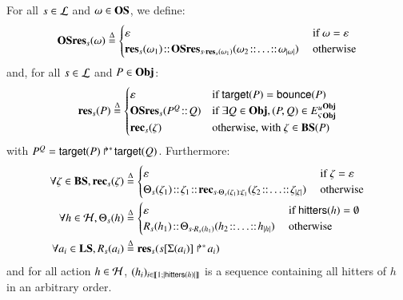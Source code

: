 \begin{definition}[$\osres : \PHl \times \OS \to \Sce$]
\label{def:concret}
For all $s \in \mathcal{L}$ and $\omega \in \mathbf{OS}$, we define:
\[
  \mathbf{OSres}_s(\omega) \stackrel{\Delta}=
    \begin{cases}
      \varepsilon
        & \text{ if $\omega = \varepsilon$} \\
      \mathbf{res}_s(\omega_1) \!::\!
      \mathbf{OSres}_{s \cdot \mathbf{res}_s(\omega_1)}(\omega_2 \!::\! \dots \!::\! \omega_{|\omega|})
        & \text{ otherwise} \\
    \end{cases}
\]
and, for all $s \in \mathcal{L}$ and $P \in \mathbf{Obj}$:
\[\mathbf{res}_s(P) \stackrel{\Delta}=
  \begin{cases}
    \varepsilon
      & \text{if } \mathsf{target}(P) = \mathsf{bounce}(P) \\
    \mathbf{OSres}_s(P^Q \!::\! Q)
      & \text{if } \exists Q \in \mathbf{Obj}, (P, Q) \in {E_\varsigma^u}^{\mathbf{Obj}}_{\mathbf{Obj}} \\
    \mathbf{rec}_s(\zeta)
      & \text{otherwise, with } \zeta \in \mathbf{BS}(P)
  \end{cases}
\]
with $P^Q = \mbox{$\mathsf{target}(P)\Rsh^*\!\mathsf{target}(Q)$}$.
Furthermore:
\begin{align*}
  \forall \zeta \in \BS,
  \rec_s(\zeta) &\DEF
    \begin{cases}
      \emptyseq
        & \text{ if $\zeta = \emptyseq$} \\
      \thisseq_s(\zeta_1) \concat \zeta_1 \concat
      \rec_{s \play \thisseq_s(\zeta_1) \concat \zeta_1}
      (\zeta_2 \concat \dots \concat \zeta_{\card{\zeta}})
        & \text{ otherwise}
    \end{cases} \\
  \forall h \in \PHh,
  \thisseq_s(h) &\DEF
    \begin{cases}
      \emptyseq
        & \text{ if $\hitter{h} = \emptyset$} \\
      \R_s(h_1) \concat \thisseq_{s \play \R_s(h_1)}(h_2 \concat \dots \concat h_{\card{h}})
        & \text{ otherwise}
    \end{cases} \\
  \forall a_i \in \Proc,
  \R_s(a_i) &\DEF \res_s(\PHobj{\PHget{s}{\PHsort(a_i)}}{a_i})
\end{align*}
and for all action $h \in \mathcal{H}$, $(h_i)_{i \in \llbracket 1; |\mathsf{hitters}(h)| \rrbracket}$
is a sequence containing all hitters of $h$ in an arbitrary order.
\end{definition}

